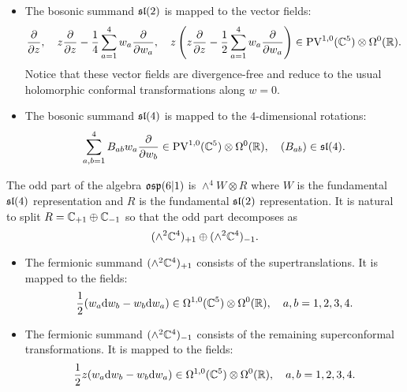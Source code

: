 \begin{itemize}[leftmargin=\parindent]
\item The bosonic summand $\mathfrak{sl}(2)$ is mapped to the vector fields:
\[
\frac{\partial}{\partial z} ,\quad z \frac{\partial}{\partial z} - \frac14 \sum_{a=1}^4 w_a \frac{\partial}{\partial w_a} , \quad z \left(z \frac{\partial}{\partial z} - \frac12 \sum_{a=1}^4 w_a \frac{\partial}{\partial w_a} \right) \in {\rm PV}^{1,0}(\mathbb C^5) \otimes \Omega^0(\mathbb R) .
\]
Notice that these vector fields are divergence-free and reduce to the usual holomorphic conformal transformations along $w=0$.
\item The bosonic summand $\mathfrak{sl}(4)$ is mapped to the $4$-dimensional rotations: 
\[
\sum_{a,b=1}^4 B_{ab} w_a \frac{\partial}{\partial w_b} \in {\rm PV}^{1,0}(\mathbb C^5) \otimes \Omega^0(\mathbb R) , \quad (B_{ab}) \in \mathfrak{sl}(4) .
\]
\end{itemize}

The odd part of the algebra $\mathfrak{osp}(6|1)$ is $\wedge^4 W \otimes R$ where $W$ is the fundamental $\mathfrak{sl}(4)$ representation and $R$ is the fundamental $\mathfrak{sl}(2)$ representation. 
It is natural to split $R = \mathbb C_{+1} \oplus \mathbb C_{-1}$ so that the odd part decomposes as
\[
(\wedge^2 \mathbb C^4)_{+1} \oplus (\wedge^2 \mathbb C^4)_{-1} .
\]

\begin{itemize}[leftmargin=\parindent]
\item 
The fermionic summand $(\wedge^2 \mathbb C^4)_{+1}$ consists of the supertranslations. 
It is mapped to the fields: 
\[
\frac{1}{2} (w_a {\rm d} w_b - w_b {\rm d} w_a) \in \Omega^{1,0}(\mathbb C^5) \otimes \Omega^0(\mathbb R) , \quad a,b=1,2,3,4 .
\] 
\item The fermionic summand $(\wedge^2 \mathbb C^4)_{-1}$ consists of the remaining superconformal transformations. 
It is mapped to the fields: 
\[
\frac{1}{2} z (w_a {\rm d} w_b - w_b {\rm d} w_a) \in \Omega^{1,0}(\mathbb C^5) \otimes \Omega^0(\mathbb R) , \quad a,b=1,2,3,4. 
\] 
\end{itemize}


